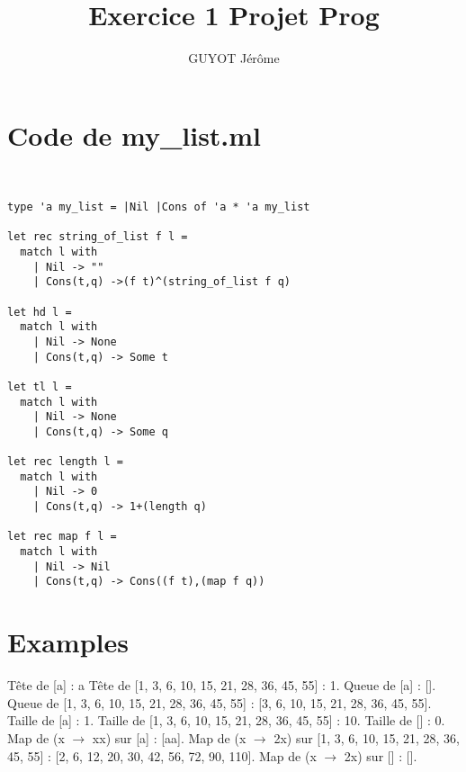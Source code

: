 \documentclass{article}
\title{Exercice 1 Projet Prog}
\author{GUYOT Jérôme}
\newenvironment{longlisting}{\captionsetup{type=listing,width=\linewidth}}{}
\begin{document}
\maketitle



\section{Code de my\_list.ml}

\begin{longlisting}
\begin{verbatim}


type 'a my_list = |Nil |Cons of 'a * 'a my_list

let rec string_of_list f l =
  match l with
    | Nil -> ""
    | Cons(t,q) ->(f t)^(string_of_list f q)

let hd l =
  match l with
    | Nil -> None
    | Cons(t,q) -> Some t

let tl l =
  match l with
    | Nil -> None
    | Cons(t,q) -> Some q

let rec length l =
  match l with
    | Nil -> 0
    | Cons(t,q) -> 1+(length q)

let rec map f l =
  match l with
    | Nil -> Nil
    | Cons(t,q) -> Cons((f t),(map f q))

\end{verbatim}
\end{longlisting}

\section{Examples}

Tête de [a] : a \newline
Tête de [1, 3, 6, 10, 15, 21, 28, 36, 45, 55] : 1.\newline
\newline
Queue de [a] : [].\newline
Queue de [1, 3, 6, 10, 15, 21, 28, 36, 45, 55] : [3, 6, 10, 15, 21, 28, 36, 45, 55].
\newline
\newline
Taille de [a] : 1.\newline
Taille de [1, 3, 6, 10, 15, 21, 28, 36, 45, 55] : 10.\newline
Taille de [] : 0.\newline
\newline
Map de (x $\rightarrow$ xx) sur [a] : [aa].\newline
Map de (x $\rightarrow$ 2x) sur [1, 3, 6, 10, 15, 21, 28, 36, 45, 55] : [2, 6, 12, 20, 30, 42, 56, 72, 90, 110].\newline
Map de (x $\rightarrow$ 2x) sur [] : [].\newline
\end{document}
